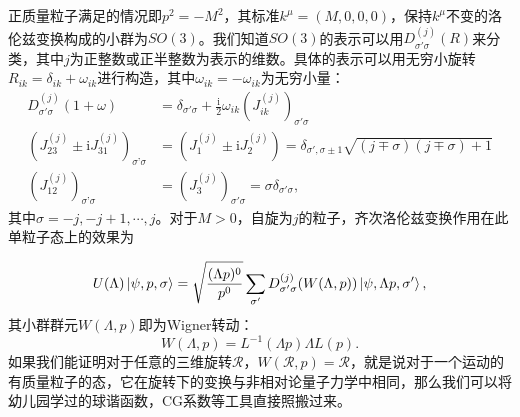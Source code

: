 正质量粒子满足的情况即$ p^{2} =-M^{2}$，其标准$ k^{\mu } =( M,0,0,0)$，保持$ k^{\mu }$不变的洛伦兹变换构成的小群为$ SO( 3)$。我们知道$ SO( 3)$的表示可以用$ D_{\sigma '\sigma }^{( j)}( R)$来分类，其中$ j$为正整数或正半整数为表示的维数。具体的表示可以用无穷小旋转$ R_{ik} =\delta _{ik} +\omega _{ik}$进行构造，其中$ \omega _{ik} =-\omega _{ik}$为无穷小量：
\begin{equation*}
	\begin{aligned}
		D_{\sigma '\sigma }^{( j)}( 1+\omega ) & =\delta _{\sigma '\sigma } +\frac{\mathrm{i}}{2} \omega _{ik} (J_{ik}^{( j)} )_{\sigma '\sigma }\\
		(J_{23}^{( j)} \pm \mathrm{i} J_{31}^{( j)} )_{\sigma ’\sigma } & =(J_{1}^{( j)} \pm \mathrm{i} J_{2}^{( j)} )=\delta _{\sigma ',\sigma \pm 1}\sqrt{( j\mp \sigma )( j\mp \sigma ) +1}\\
		(J_{12}^{( j)} )_{\sigma ’\sigma } & =(J_{3}^{( j)} )_{\sigma '\sigma } =\sigma \delta _{\sigma '\sigma } ,
	\end{aligned}
\end{equation*}
其中$ \sigma =-j,-j+1,\cdots ,j$。对于$ M >0$，自旋为$ j$的粒子，齐次洛伦兹变换作用在此单粒子态上的效果为

\begin{equation}
	U( \Lambda )\ket{\psi ,p,\sigma } =\sqrt{\frac{( \Lambda p)^{0}}{p^{0}}}\sum _{\sigma '} D_{\sigma '\sigma }^{( j)}( W( \Lambda ,p))\ket{\psi ,\Lambda p,\sigma '} ,
	\label{eq:lorentz_trans_on_single_particle_state}
\end{equation}其小群群元$ W( \Lambda ,p)$即为Wigner转动：
\begin{equation}
	W( \Lambda ,p) =L^{-1}( \Lambda p) \Lambda L( p) .
	\label{eq:little_grp_element}
\end{equation}
如果我们能证明对于任意的三维旋转$ \mathcal{R}$，$ W(\mathcal{R} ,p) =\mathcal{R}$，就是说对于一个运动的有质量粒子的态，它在旋转下的变换与非相对论量子力学中相同，那么我们可以将幼儿园学过的球谐函数，CG系数等工具直接照搬过来。

